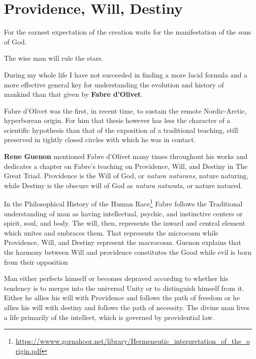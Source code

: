 \section{Providence, Will, Destiny}

\begin{quotex}
For the earnest expectation of the creation waits for the manifestation of the sons of God. 

The wise man will rule the stars. 

During my whole life I have not succeeded in finding a more lucid formula and a more effective general key for understanding the evolution and history of mankind than that given by \textbf{Fabre d'Olivet}.

Fabre d'Olivet was the first, in recent time, to sustain the remote Nordic-Arctic, hyperborean origin. For him that thesis however has less the character of a scientific hypothesis than that of the exposition of a traditional teaching, still preserved in tightly closed circles with which he was in contact. 
\end{quotex}

\textbf{Rene Guenon} mentioned Fabre d'Olivet many times throughout his works and dedicates a chapter on Fabre's teaching on Providence, Will, and Destiny in The Great Triad. Providence is the Will of God, or \emph{natura naturans}, nature naturing, while Destiny is the obscure will of God as \emph{natura naturata}, or nature natured.

In the Philosophical History of the Human Race\footnote{\url{https://wwww.gornahoor.net/library/Hermeneutic\_interpretation\_of\_the\_origin.pdf}} Fabre follows the Traditional understanding of man as having intellectual, psychic, and instinctive centers or spirit, soul, and body. The will, then, represents the inward and central element which unites and embraces them. That represents the microcosm while Providence, Will, and Destiny represent the macrocosm. Guenon explains that the harmony between Will and providence constitutes the Good while evil is born from their opposition

\begin{quotex}
Man either perfects himself or becomes depraved according to whether his tendency is to merges into the universal Unity or to distinguish himself from it. Either he allies his will with Providence and follows the path of freedom or he allies his will with destiny and follows the path of necessity. The divine man lives a life primarily of the intellect, which is governed by providential law.
\end{quotex}


